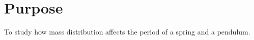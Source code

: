 \section{Purpose}
\vspace{-0.5cm}
\singlespacing

To study how mass distribution affects the period of a spring and a pendulum.
